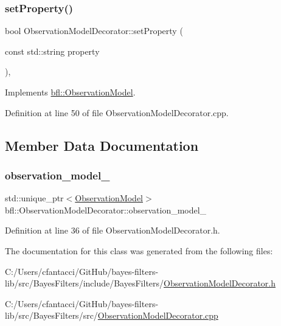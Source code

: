 \subsubsection{\texorpdfstring{set\+Property()}{setProperty()}}
{\footnotesize\ttfamily bool Observation\+Model\+Decorator\+::set\+Property (\begin{DoxyParamCaption}\item[{const std\+::string}]{property }\end{DoxyParamCaption})\hspace{0.3cm}{\ttfamily [override]}, {\ttfamily [virtual]}}



Implements \mbox{\hyperlink{classbfl_1_1ObservationModel_a05991496674f63b6ea6c8a34da34194d}{bfl\+::\+Observation\+Model}}.



Definition at line 50 of file Observation\+Model\+Decorator.\+cpp.



\subsection{Member Data Documentation}
\mbox{\label{classbfl_1_1ObservationModelDecorator_abec4efacd0bb8e55bb9a6aade1bb28ad}} 
\subsubsection{\texorpdfstring{observation\+\_\+model\+\_\+}{observation\_model\_}}
{\footnotesize\ttfamily std\+::unique\+\_\+ptr$<$\mbox{\hyperlink{classbfl_1_1ObservationModel}{Observation\+Model}}$>$ bfl\+::\+Observation\+Model\+Decorator\+::observation\+\_\+model\+\_\+\hspace{0.3cm}{\ttfamily [private]}}



Definition at line 36 of file Observation\+Model\+Decorator.\+h.



The documentation for this class was generated from the following files\+:\begin{DoxyCompactItemize}
\item 
C\+:/\+Users/cfantacci/\+Git\+Hub/bayes-\/filters-\/lib/src/\+Bayes\+Filters/include/\+Bayes\+Filters/\mbox{\hyperlink{ObservationModelDecorator_8h}{Observation\+Model\+Decorator.\+h}}\item 
C\+:/\+Users/cfantacci/\+Git\+Hub/bayes-\/filters-\/lib/src/\+Bayes\+Filters/src/\mbox{\hyperlink{ObservationModelDecorator_8cpp}{Observation\+Model\+Decorator.\+cpp}}\end{DoxyCompactItemize}
